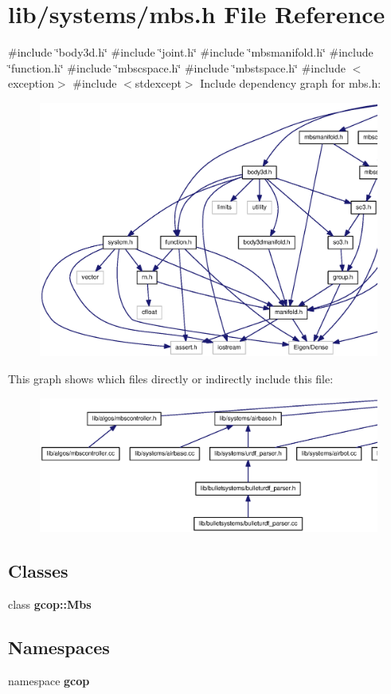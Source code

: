 \section{lib/systems/mbs.h \-File \-Reference}
\label{mbs_8h}
{\ttfamily \#include \char`\"{}body3d.\-h\char`\"{}}\*
{\ttfamily \#include \char`\"{}joint.\-h\char`\"{}}\*
{\ttfamily \#include \char`\"{}mbsmanifold.\-h\char`\"{}}\*
{\ttfamily \#include \char`\"{}function.\-h\char`\"{}}\*
{\ttfamily \#include \char`\"{}mbscspace.\-h\char`\"{}}\*
{\ttfamily \#include \char`\"{}mbstspace.\-h\char`\"{}}\*
{\ttfamily \#include $<$exception$>$}\*
{\ttfamily \#include $<$stdexcept$>$}\*
\-Include dependency graph for mbs.\-h\-:\nopagebreak
\begin{figure}[H]
\begin{center}
\leavevmode
\includegraphics[width=350pt]{mbs_8h__incl}
\end{center}
\end{figure}
\-This graph shows which files directly or indirectly include this file\-:
\nopagebreak
\begin{figure}[H]
\begin{center}
\leavevmode
\includegraphics[width=350pt]{mbs_8h__dep__incl}
\end{center}
\end{figure}
\subsection*{\-Classes}
\begin{DoxyCompactItemize}
\item 
class {\bf gcop\-::\-Mbs}
\end{DoxyCompactItemize}
\subsection*{\-Namespaces}
\begin{DoxyCompactItemize}
\item 
namespace {\bf gcop}
\end{DoxyCompactItemize}

